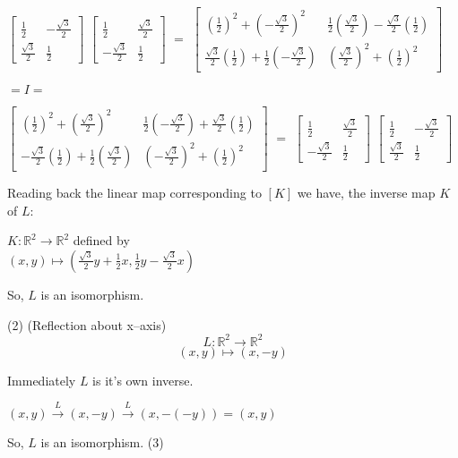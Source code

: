 \documentclass{article}
\begin{document}
$
\begin{bmatrix}
  \frac{1}{2} & -\frac{\sqrt{3}}{2}\\
  \frac{\sqrt{3}}{2} & \frac{1}{2}
\end{bmatrix}
$
$
\begin{bmatrix}
  \frac{1}{2} & \frac{\sqrt{3}}{2}\\
  -\frac{\sqrt{3}}{2} & \frac{1}{2}
\end{bmatrix}
$
$=$
$
\begin{bmatrix}
  (\frac{1}{2})^2 +(-\frac{\sqrt{3}}{2})^2 &
  \frac{1}{2}(\frac{\sqrt{3}}{2}) - \frac{\sqrt{3}}{2}(\frac{1}{2})\\
  \frac{\sqrt{3}}{2}(\frac{1}{2}) + \frac{1}{2}(-\frac{\sqrt{3}}{2}) &
  (\frac{\sqrt{3}}{2})^2 + (\frac{1}{2})^2
\end{bmatrix}
$

$= I =$

$
\begin{bmatrix}
  (\frac{1}{2})^2 +(\frac{\sqrt{3}}{2})^2 &
  \frac{1}{2}(-\frac{\sqrt{3}}{2}) + \frac{\sqrt{3}}{2}(\frac{1}{2})\\
  -\frac{\sqrt{3}}{2}(\frac{1}{2}) + \frac{1}{2}(\frac{\sqrt{3}}{2}) &
  (-\frac{\sqrt{3}}{2})^2 + (\frac{1}{2})^2
\end{bmatrix}
$
$=$
$
\begin{bmatrix}
  \frac{1}{2} & \frac{\sqrt{3}}{2}\\
  -\frac{\sqrt{3}}{2} & \frac{1}{2}
\end{bmatrix}
$
$
\begin{bmatrix}
  \frac{1}{2} & -\frac{\sqrt{3}}{2}\\
  \frac{\sqrt{3}}{2} & \frac{1}{2}
\end{bmatrix}
$

Reading back the linear map corresponding to $[ K ]$ we have, the
inverse map $K$ of $L$:

$K:\mathbb{R}^2 \rightarrow \mathbb{R}^2$ defined by\\
$(x,y) \mapsto (\frac{\sqrt{3}}{2}y+\frac{1}{2}x,\frac{1}{2}y-\frac{\sqrt{3}}{2}x)$

So, $L$ is an isomorphism.

(2) (Reflection about x–axis)
\[L:\mathbb{R}^2 \rightarrow \mathbb{R}^2\]
\[(x, y) \mapsto (x, −y)\]

Immediately $L$ is it's own inverse.

$(x,y) \stackrel{L}{\rightarrow} (x,-y) \stackrel{L}{\rightarrow}
(x,-(-y)) = (x,y)$

So, $L$ is an isomorphism.
\newpage
(3)
\end{document}
